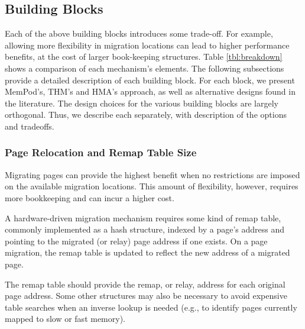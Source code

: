 \subsection{Building Blocks}

Each of the above building blocks introduces some trade-off. For example, allowing more flexibility in migration locations can lead to higher performance benefits, at the cost of larger book-keeping structures. Table \ref{tbl:breakdown} shows a comparison of each mechanism's elements. The following subsections provide a detailed description of each building block. For each block, we present MemPod's, THM's and HMA's approach, as well as alternative designs found in the literature. The design choices for the various building blocks are largely
orthogonal.  Thus, we describe each separately, with description of the options
and tradeoffs.

\subsubsection{Page Relocation and Remap Table Size}
\label{sec:relocation}

Migrating pages can provide the highest benefit when no restrictions are imposed on the available migration locations.  This amount of flexibility, however,
requires more bookkeeping and can incur a higher cost.

A hardware-driven migration mechanism requires some kind of remap table,
commonly implemented as a hash structure, indexed by a page's address and pointing to the migrated (or relay) page address if one exists. On a page migration, the remap table is updated to reflect the new address of a migrated page. 

The remap table should provide the remap, or relay, address for each original
page address.  Some other structures may also be necessary to avoid expensive
table searches when an inverse lookup is needed (e.g., to identify pages
currently mapped to slow or fast memory).

